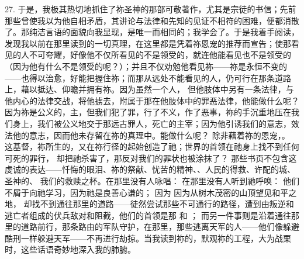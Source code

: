 27. 于是，我极其热切地抓住了祢圣神的那部可敬著作，尤其是宗徒的书信；先前那些曾使我以为他自相矛盾，其讲论与法律和先知的见证不相符的困难，便都消散了。那纯洁言语的面貌向我显现，是唯一而相同的；我学会了。于是我着手阅读，发现我以前在那里读到的一切真理，在这里都是凭着祢恩宠的推荐而宣告；使那看见的人不可夸耀，好像他不仅所看见的不是领受的，就连他能看见也不是领受的（因为他有什么不是领受的呢？）；并且不仅劝勉他看见祢——祢是永恒不变的——也得以治愈，好能把握住祢；而那从远处不能看见的人，仍可行在那条道路上，藉以抵达、仰瞻并拥有祢。因为虽然一个人， 但他肢体中另有一条法律，与他内心的法律交战，将他掳去，附属于那在他肢体中的罪恶法律，他能做什么呢？因为祢是公义的，主，但我们犯了罪，行了不义，作了恶事，祢的手沉重地压在我们身上，我们被公义地交于那远古罪人，死亡的主宰；因为他引诱我们的意志，效法他的意志，因而他未存留在祢的真理中。能做什么呢？ 除非藉着祢的恩宠，。 这基督，祢所生的，又在祢行径的起始创造了祂；世界的首领在祂身上找不到任何可死的罪行， 却把祂杀害了，那反对我们的罪状也被涂抹了？ 那些书页不包含这虔诚的表达——忏悔的眼泪、祢的祭献、忧苦的精神、、人民的得救、许配的城、 圣神的、 我们的救赎之杯。在那里没有人咏唱： 在那里没有人听到祂呼唤： 他们不屑于向祂学习，因为祂是良善心谦的； 因为  因为从树木茂密的山顶望见和平之地， 却找不到通往那里的道路——徒然尝试那些不可通行的路径，遭到由叛逆和逃亡者组成的伏兵敌对和阻截，他们的首领是那   和 ； 而另一件事则是沿着通往那里的道路前行，那条路由的军队守护，在那里，那些逃离天军的人——他们像躲避酷刑一样躲避天军——不再进行劫掠。当我读到祢的，默观祢的工程，大为战栗时，这些话语奇妙地深入我的肺腑。\par


